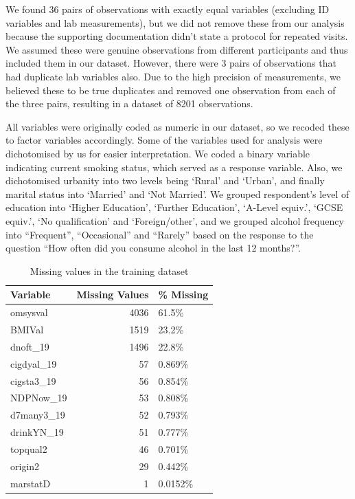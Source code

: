 \documentclass[
  11pt,
  twocolumn]{article}
\begin{document}
We found 36 pairs of observations with exactly equal variables
(excluding ID variables and lab measurements), but we did not remove
these from our analysis because the supporting documentation didn't
state a protocol for repeated visits. We assumed these were genuine
observations from different participants and thus included them in our
dataset. However, there were 3 pairs of observations that had duplicate
lab variables also. Due to the high precision of measurements, we
believed these to be true duplicates and removed one observation from
each of the three pairs, resulting in a dataset of 8201 observations.

All variables were originally coded as numeric in our dataset, so we
recoded these to factor variables accordingly. Some of the variables
used for analysis were dichotomised by us for easier interpretation. We
coded a binary variable indicating current smoking status, which served
as a response variable. Also, we dichotomised urbanity into two levels
being `Rural' and `Urban', and finally marital status into `Married' and
`Not Married'. We grouped respondent's level of education into `Higher
Education', `Further Education', `A-Level equiv.', `GCSE equiv.', `No
qualification' and `Foreign/other', and we grouped alcohol frequency
into ``Frequent'', ``Occasional'' and ``Rarely'' based on the response
to the question ``How often did you consume alcohol in the last 12
months?''.

\begin{table}

\caption{\label{tab:outputnatable}Missing values in the training dataset\label{tab:output-na-table}}
\centering
\fontsize{7}{9}\selectfont
\begin{tabular}[t]{l|r|l}
\hline
\textbf{Variable} & \textbf{Missing Values} & \textbf{\% Missing}\\
\hline
omsysval & 4036 & 61.5\%\\
\hline
BMIVal & 1519 & 23.2\%\\
\hline
dnoft\_19 & 1496 & 22.8\%\\
\hline
cigdyal\_19 & 57 & 0.869\%\\
\hline
cigsta3\_19 & 56 & 0.854\%\\
\hline
NDPNow\_19 & 53 & 0.808\%\\
\hline
d7many3\_19 & 52 & 0.793\%\\
\hline
drinkYN\_19 & 51 & 0.777\%\\
\hline
topqual2 & 46 & 0.701\%\\
\hline
origin2 & 29 & 0.442\%\\
\hline
marstatD & 1 & 0.0152\%\\
\hline
\end{tabular}
\end{table}
\end{document}
